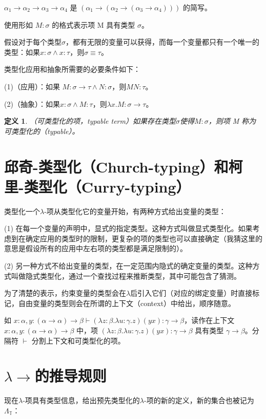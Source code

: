 \documentclass[UTF8]{article}
\newtheorem{thm}{定义}[section]
\begin{document}
		$\alpha_1 \rightarrow \alpha_2 \rightarrow \alpha_3 \rightarrow \alpha_4$ 是 $(\alpha_1 \rightarrow (\alpha_2 \rightarrow (\alpha_3 \rightarrow \alpha_4)))$ 的简写。
		
		使用形如 $M:\sigma$ 的格式表示项 M 具有类型 $\sigma$。
		
		假设对于每个类型$\sigma$，都有无限的变量可以获得，而每一个变量都只有一个唯一的类型：如果$x:\sigma \land x:\tau$，则$\sigma \equiv \tau$。
		
		类型化应用和抽象所需要的必要条件如下：
		
		(1)（应用）：如果 $M:\sigma\rightarrow\tau\land N:\sigma$，则$MN:\tau$。
		
		(2)（抽象）：如果$x:\sigma\land M:\tau$，则$\lambda x.M:\sigma\rightarrow\tau$。
		
		\begin{thm}
			（可类型化的项，typable term）如果存在类型$\sigma$使得$M:\sigma$，则项 M 称为可类型化的（typable）。
		\end{thm}

	\section{邱奇-类型化（Church-typing）和柯里-类型化（Curry-typing）}
		类型化一个$\lambda$-项从类型化它的变量开始，有两种方式给出变量的类型：
		
		(1) 在每一个变量的声明中，显式的指定类型。这种方式叫做显式类型化。如果考虑到在确定应用的类型时的限制，更复杂的项的类型也可以直接确定（我猜这里的意思是假设所有的应用中左右项的类型都是满足限制的）。
		
		(2) 另一种方式不给出变量的类型，在一定范围内隐式的确定变量的类型。这种方式叫做隐式类型化，通过一个查找过程来推断类型，其中可能包含了猜测。
		
		为了清楚的表示，约束变量的类型会在$\lambda$后引入它们（对应的绑定变量）时直接标记，自由变量的类型则会在所谓的上下文（context）中给出，顺序随意。
		
		如 $x:\alpha,y:(\alpha\rightarrow\alpha)\rightarrow\beta\vdash(\lambda z:\beta.\lambda u:\gamma.z)(yx):\gamma\rightarrow\beta$，读作在上下文 $x:\alpha,y:(\alpha\rightarrow\alpha)\rightarrow\beta$ 中，项 $(\lambda z:\beta.\lambda u:\gamma.z)(yx):\gamma\rightarrow\beta$ 具有类型 $\gamma\rightarrow\beta$。分隔符 $\vdash$ 分割上下文和可类型化的项。
		
	\section{$\lambda{\rightarrow}$的推导规则}
		现在$\lambda$-项具有类型信息，给出预先类型化的$\lambda$-项的新的定义，新的集合也被记为$\Lambda_\mathbb{T}$：
		
\end{document}
